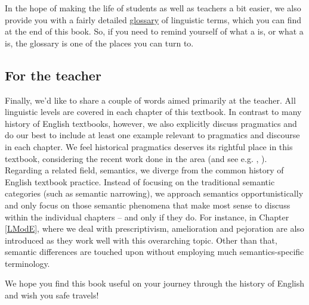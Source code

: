 In the hope of making the life of students as well as teachers a bit easier, we also provide you with a fairly detailed \hyperref[glossary]{glossary} of linguistic terms, which you can find at the end of this book. So, if you need to remind yourself of what a  is, or what a  is, the glossary is one of the places you can turn to.

\subsection*{For the teacher}
Finally, we'd like to share a couple of words aimed primarily at the teacher. All linguistic levels are covered in each chapter of this textbook. In contrast to many history of English textbooks, however, we also explicitly discuss pragmatics and do our best to include at least one example relevant to pragmatics and discourse in each chapter. We feel historical pragmatics deserves its rightful place in this textbook, considering the recent work done in the area (and see e.g. \citealp{JuckerTaavitsainen2013}, \citealp{Arnovick2017}). Regarding a related field, semantics, we diverge from the common history of English textbook practice. Instead of focusing on the traditional semantic categories (such as semantic narrowing), we approach semantics opportunistically and only focus on those semantic phenomena that make most sense to discuss within the individual chapters -- and only if they do. For instance, in Chapter \ref{LModE}, where we deal with prescriptivism, amelioration and pejoration are also introduced as they work well with this overarching topic. Other than that, semantic differences are touched upon without employing much semantics-specific terminology.
\vspace{10pt}

\noindent We hope you find this book useful on your journey through the history of English and wish you safe travels!
